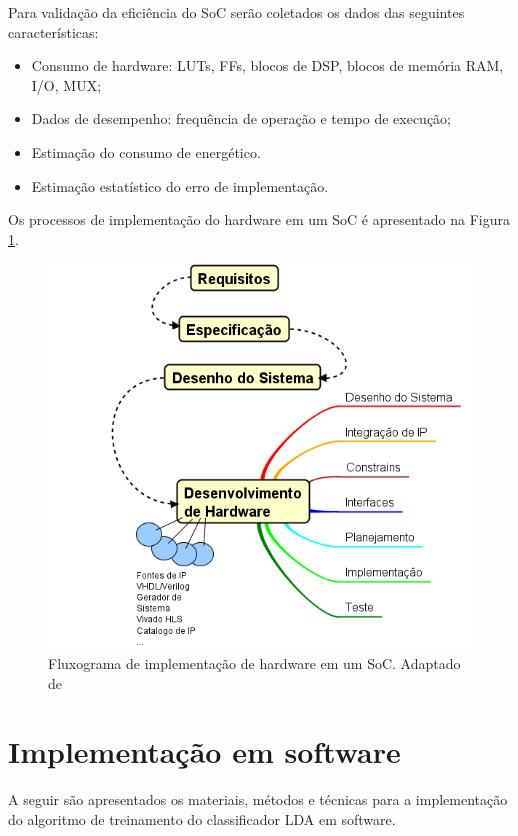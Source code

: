 Para validação da eficiência do SoC serão coletados os dados das seguintes características:
\begin{itemize}
	\item Consumo de hardware: LUTs, FFs, blocos de DSP, blocos de memória RAM, I/O, MUX;
	\item Dados de desempenho: frequência de operação e tempo de execução;
	\item Estimação do consumo de energético.
	\item Estimação estatístico do erro de implementação.
\end{itemize}

Os processos de implementação do hardware em um SoC é apresentado na Figura \ref{diagram_hardware}.

\begin{figure}[h]
	\centering
	\includegraphics[keepaspectratio=true,scale=1.0]{figuras/fluxograma_hardware.PNG}
	\caption{Fluxograma de implementação de hardware em um SoC. Adaptado de \cite{zynqBook}}
	\label{diagram_hardware}
\end{figure}

\section{Implementação em software}
A seguir são apresentados os materiais, métodos e técnicas para a implementação do
algoritmo de treinamento do classificador LDA em software.

